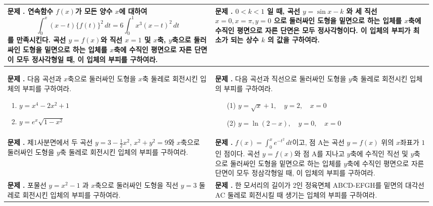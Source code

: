 \documentclass[10pt, a4paper]{article}
\newcounter{probcount}
\newcommand{\exercise}[1]{%
    \stepcounter{probcount}%
    \begin{minipage}[t][120mm][t]{0.44\textwidth}
        \small 
        \vspace{1mm}
        \noindent \textbf{문제 \arabic{probcount}.} #1
    \end{minipage}%
}
\begin{document}
\noindent
\begin{longtable}{p{} | p{}}
    
    \exercise{연속함수 $f(x)$가 모든 양수 $x$에 대하여
    \[ \int_{0}^{x} (x-t)\{f(t)\}^2 \,dt = 6 \int_{0}^{1} x^3(x-t)^2 \,dt \]
    를 만족시킨다. 곡선 $y=f(x)$와 직선 $x=1$ 및 $x$축, $y$축으로 둘러싸인 도형을 밑면으로 하는 입체를 $x$축에 수직인 평면으로 자른 단면이 모두 정사각형일 때, 이 입체의 부피를 구하여라.} 
    & 
    \exercise{$0 < k < 1$ 일 때, 곡선 $y = \sin x - k$ 와 세 직선 $x = 0, x = \pi, y = 0$ 으로 둘러싸인 도형을 밑면으로 하는 입체를 $x$축에 수직인 평면으로 자른 단면은 모두 정사각형이다. 이 입체의 부피가 최소가 되는 상수 $k$ 의 값을 구하여라.} \\
    \hline 
    
    \exercise{다음 곡선과 $x$축으로 둘러싸인 도형을 $x$축 둘레로 회전시킨 입체의 부피를 구하여라.
    \begin{enumerate}[label=(\arabic*), leftmargin=8mm, nosep]
        \item $y = x^4 - 2x^2 + 1$
        \item $y = e^x \sqrt{1-x^2}$
    \end{enumerate}} 
    & 
    \exercise{다음 곡선과 직선으로 둘러싸인 도형을 $y$축 둘레로 회전시킨 입체의 부피를 구하여라.
    \begin{enumerate}
        \item[(1)] $y = \sqrt{x} + 1, \quad y = 2, \quad x = 0$
        \item[(2)] $y = \ln(2-x), \quad y = 0, \quad x = 0$
    \end{enumerate}} \\
   

    \exercise{제1사분면에서 두 곡선 $y=3-\frac{1}{2}x^2$, $x^2+y^2=9$와 $x$축으로 둘러싸인 도형을 $y$축 둘레로 회전시킨 입체의 부피를 구하여라.} 
    & 
    \exercise{$f(x)=\int_{0}^{x} e^{-t^2}\,dt$이고, 점 $\text{A}$는 곡선 $y=f(x)$ 위의 $x$좌표가 $1$인 점이다. 곡선 $y=f(x)$와 점 $\text{A}$를 지나고 $y$축에 수직인 직선 및 $y$축으로 둘러싸인 도형을 밑면으로 하는 입체를 $y$축에 수직인 평면으로 자른 단면이 모두 정삼각형일 때, 이 입체의 부피를 구하여라.} \\
    \hline

    \exercise{포물선 $y = x^2 - 1$ 과 $x$축으로 둘러싸인 도형을 직선 $y = 3$ 둘레로 회전시킨 입체의 부피를 구하여라.} 
    & 
    \exercise{한 모서리의 길이가 2인 정육면체 ABCD-EFGH를 밑면의 대각선 AC 둘레로 회전시킬 때 생기는 입체의 부피를 구하여라.} \\
    

\end{longtable}
\end{document}
